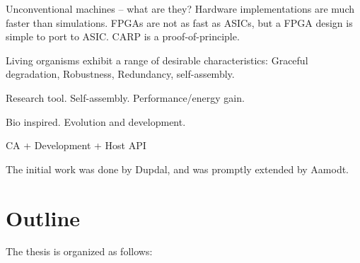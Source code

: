 \TODO
Unconventional machines – what are they?
Hardware implementations are much faster than simulations.
FPGAs are not as fast as ASICs, but a FPGA design is simple to port to ASIC.
CARP is a proof-of-principle.

Living organisms exhibit a range of desirable characteristics:
Graceful degradation, Robustness, Redundancy, self-assembly.

Research tool.
Self-assembly.
Performance/energy gain.

Bio inspired.
Evolution and development.

CA + Development + Host API


The initial work was done by Dupdal, and was promptly extended by Aamodt.

\section{Outline}

The thesis is organized as follows:

